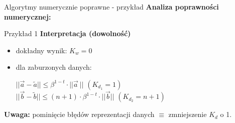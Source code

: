 \begin{frame}[fragile]{Algorytmy numerycznie poprawne - przykład}
	\textbf{Analiza poprawności numerycznej:}
	\begin{exampleblock}{Przykład 1}
    	{\bf Interpretacja (dowolność)}
        \begin{itemize}
        	\item dokładny wynik: $K_w = 0$
            \item dla zaburzonych danych:
            	\begin{addmargin}[1cm]{0cm}
            		$|| \vec{a} - \tilde{a} || \le \beta^{1-t} \cdot || \vec{a} \ ||$ \hspace{.5cm} $(K_{d_1} = 1)$\\
            		$|| \vec{b} - \tilde{b} || \le (n + 1) \cdot \beta^{1-t} \cdot || \vec{b} ||$ \hspace{.5cm} $(K_{d_2} = n+1)$
            	\end{addmargin}
        \end{itemize}
        {\bf Uwaga:} pominięcie błędów reprezentacji danych $\equiv$ zmniejszenie $K_d$ o 1.
	\end{exampleblock}
\end{frame}
